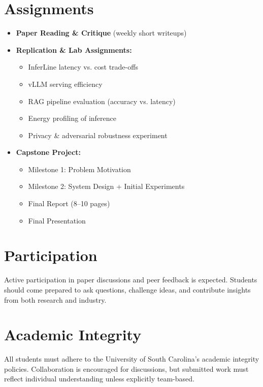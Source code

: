 \documentclass[11pt]{article}
\begin{document}
\section*{Assignments}
\begin{itemize}[leftmargin=*]
    \item \textbf{Paper Reading \& Critique} (weekly short writeups)  
    \item \textbf{Replication \& Lab Assignments:}  
    \begin{itemize}
        \item InferLine latency vs. cost trade-offs  
        \item vLLM serving efficiency  
        \item RAG pipeline evaluation (accuracy vs. latency)  
        \item Energy profiling of inference  
        \item Privacy \& adversarial robustness experiment  
    \end{itemize}
    \item \textbf{Capstone Project:}  
    \begin{itemize}
        \item Milestone 1: Problem Motivation  
        \item Milestone 2: System Design + Initial Experiments  
        \item Final Report (8–10 pages)  
        \item Final Presentation  
    \end{itemize}
\end{itemize}

\section*{Participation}
Active participation in paper discussions and peer feedback is expected. Students should come prepared to ask questions, challenge ideas, and contribute insights from both research and industry.

\section*{Academic Integrity}
All students must adhere to the University of South Carolina’s academic integrity policies. Collaboration is encouraged for discussions, but submitted work must reflect individual understanding unless explicitly team-based.
\end{document}
